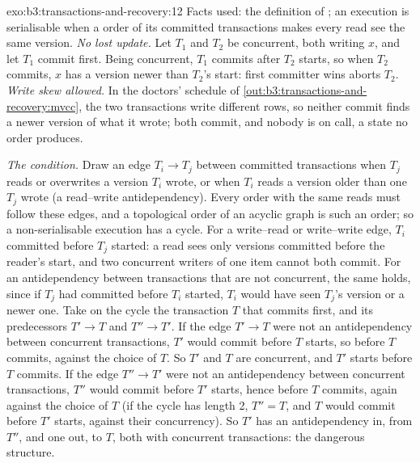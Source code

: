\begin{solution}{exo:b3:transactions-and-recovery:12}
Facts used: the definition of ; an execution is serialisable when a  order of its committed transactions makes every read see the same version. \emph{No lost update.} Let $T_1$ and $T_2$ be concurrent, both writing $x$, and let $T_1$ commit first. Being concurrent, $T_1$ commits after $T_2$ starts, so when $T_2$ commits, $x$ has a version newer than $T_2$'s start: first committer wins aborts $T_2$. \emph{Write skew allowed.} In the doctors' schedule of \cref{out:b3:transactions-and-recovery:mvcc}, the two transactions write different rows, so neither commit finds a newer version of what it wrote; both commit, and nobody is on call, a state no  order produces.

\emph{The condition.} Draw an edge $T_i \to T_j$ between committed transactions when $T_j$ reads or overwrites a version $T_i$ wrote, or when $T_i$ reads a version older than one $T_j$ wrote (a read--write antidependency). Every  order with the same reads must follow these edges, and a topological order of an acyclic graph is such an order; so a non-serialisable execution has a cycle. For a write--read or write--write edge, $T_i$ committed before $T_j$ started: a read sees only versions committed before the reader's start, and two concurrent writers of one item cannot both commit. For an antidependency between transactions that are not concurrent, the same holds, since if $T_j$ had committed before $T_i$ started, $T_i$ would have seen $T_j$'s version or a newer one. Take on the cycle the transaction $T$ that commits first, and its predecessors $T' \to T$ and $T'' \to T'$. If the edge $T' \to T$ were not an antidependency between concurrent transactions, $T'$ would commit before $T$ starts, so before $T$ commits, against the choice of $T$. So $T'$ and $T$ are concurrent, and $T'$ starts before $T$ commits. If the edge $T'' \to T'$ were not an antidependency between concurrent transactions, $T''$ would commit before $T'$ starts, hence before $T$ commits, again against the choice of $T$ (if the cycle has length 2, $T'' = T$, and $T$ would commit before $T'$ starts, against their concurrency). So $T'$ has an antidependency in, from $T''$, and one out, to $T$, both with concurrent transactions: the dangerous structure.
\end{solution}

